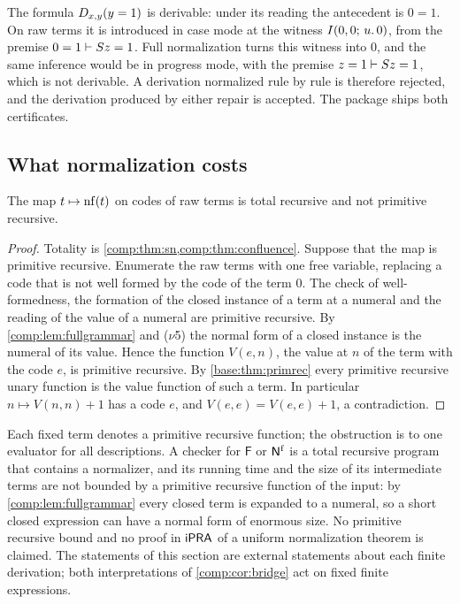 \begin{example}
\label{comp:ex:modechange}
The formula $D_{x,y}(y=1)$ is derivable: under its reading the antecedent
is $0=1$. On raw terms it is introduced in case mode at the witness
$I(0,0;\,u.\,0)$, from the premise $0=1\vdash S z=1$. Full
normalization turns this witness into $0$, and the same inference would be
in progress mode, with the premise $z=1\vdash S z=1$, which is not
derivable. A derivation normalized rule by rule is therefore rejected, and
the derivation produced by either repair is accepted. The package
 ships both certificates.
\end{example}

\subsection{What normalization costs}

\begin{proposition}
\label{comp:prop:notpr}
The map $t\mapsto\operatorname{nf}(t)$ on codes of raw terms is total recursive and not
primitive recursive.
\end{proposition}

\begin{proof}
Totality is \cref{comp:thm:sn,comp:thm:confluence}. Suppose that the map is
primitive recursive. Enumerate the raw terms with one free variable,
replacing a code that is not well formed by the code of the term $0$. The
check of well-formedness, the formation of the closed instance of a term at
a numeral and the reading of the value of a numeral are primitive recursive.
By \cref{comp:lem:fullgrammar} and ($\nu$5) the normal form of a closed
instance is the numeral of its value. Hence the function $V(e,n)$, the
value at $n$ of the term with the code $e$, is primitive recursive. By
\cref{base:thm:primrec} every primitive recursive unary function is the
value function of such a term. In particular $n\mapsto V(n,n)+1$ has a code
$e$, and $V(e,e)=V(e,e)+1$, a contradiction.
\end{proof}

Each fixed term denotes a primitive recursive function; the obstruction is
to one evaluator for all descriptions. A checker for $\mathsf{F}$ or
$\mathsf{N}^{\mathrm f}$ is a total recursive program that contains a normalizer,
and its running time and the size of its intermediate terms are not bounded
by a primitive recursive function of the input: by
\cref{comp:lem:fullgrammar} every closed term is expanded to a numeral, so
a short closed expression can have a normal form of enormous size. No
primitive recursive bound and no proof in $\mathsf{iPRA}$ of a uniform normalization
theorem is claimed. The statements of this section are external statements
about each finite derivation; both interpretations of
\cref{comp:cor:bridge} act on fixed finite expressions.

